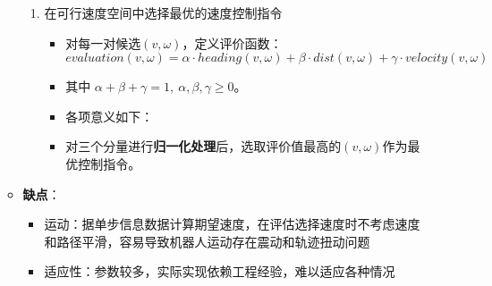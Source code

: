 \documentclass[../main.tex]{subfiles}
\begin{document}
\begin{enumerate}
\begin{itemize}
\begin{enumerate}
                    \item 在可行速度空间中选择最优的速度控制指令
                        \begin{itemize}
                            \item {\small\kaishu 对每一对候选$(v,\omega)$，定义评价函数：}
                            \[
                            evaluation(v,\omega) = \alpha \cdot heading(v,\omega) + \beta \cdot dist(v,\omega) + \gamma \cdot velocity(v,\omega)
                            \]
                            \item {\small\kaishu 其中 $\alpha + \beta + \gamma = 1, \ \alpha,\beta,\gamma \ge 0$。}
                            \item {\small\kaishu 各项意义如下：}
                            \item {\small\kaishu 对三个分量进行\textbf{归一化处理}后，选取评价值最高的$(v,\omega)$作为最优控制指令。}
                        \end{itemize}
                \end{enumerate}

            \item \textbf{缺点}：
                \begin{itemize}
                    \item 运动：据单步信息数据计算期望速度，在评估选择速度时不考虑速度和路径平滑，容易导致机器人运动存在震动和轨迹扭动问题
                    \item 适应性：参数较多，实际实现依赖工程经验，难以适应各种情况
                \end{itemize}
        \end{itemize}



\end{enumerate}
\end{document}
